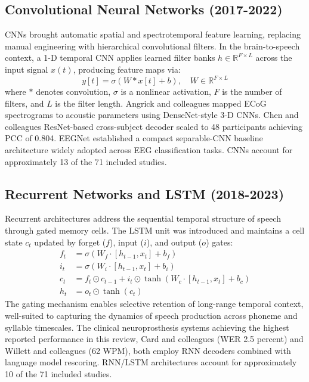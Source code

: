 \subsection{Convolutional Neural Networks (2017-2022)}

CNNs brought automatic spatial and spectrotemporal feature learning, replacing manual engineering with hierarchical convolutional filters. In the brain-to-speech context, a 1-D temporal CNN applies learned filter banks $h \in \mathbb{R}^{F \times L}$ across the input signal $x(t)$, producing feature maps via:
\begin{equation}
y[t] = \sigma(W * x[t] + b), \quad W \in \mathbb{R}^{F \times L}
\end{equation}
where $*$ denotes convolution, $\sigma$ is a nonlinear activation, $F$ is the number of filters, and $L$ is the filter length. Angrick and colleagues \cite{Angrick2019} mapped ECoG spectrograms to acoustic parameters using DenseNet-style 3-D CNNs. Chen and colleagues \cite{Chen2024Neural} ResNet-based cross-subject decoder scaled to 48 participants achieving PCC of 0.804. EEGNet \cite{Lawhern2018} established a compact separable-CNN baseline architecture widely adopted across EEG classification tasks. CNNs account for approximately 13 of the 71 included studies.

\subsection{Recurrent Networks and LSTM (2018-2023)}

Recurrent architectures address the sequential temporal structure of speech through gated memory cells. The LSTM unit was introduced \cite{Hochreiter1997} and maintains a cell state $c_t$ updated by forget ($f$), input ($i$), and output ($o$) gates:
\begin{align}
f_t &= \sigma(W_f \cdot [h_{t-1}, x_t] + b_f) \label{eq:forget} \\
i_t &= \sigma(W_i \cdot [h_{t-1}, x_t] + b_i) \\
c_t &= f_t \odot c_{t-1} + i_t \odot \tanh(W_c \cdot [h_{t-1}, x_t] + b_c) \\
h_t &= o_t \odot \tanh(c_t)
\end{align}
The gating mechanism enables selective retention of long-range temporal context, well-suited to capturing the dynamics of speech production across phoneme and syllable timescales. The clinical neuroprosthesis systems achieving the highest reported performance in this review, Card and colleagues \cite{Card2024} (WER 2.5 percent) and Willett and colleagues \cite{Willett2023} (62 WPM), both employ RNN decoders combined with language model rescoring. RNN/LSTM architectures account for approximately 10 of the 71 included studies.

